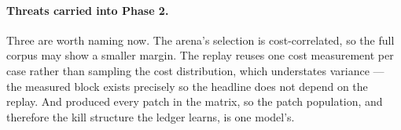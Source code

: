 \paragraph{Threats carried into Phase 2.} Three are worth naming now. The
arena's selection is cost-correlated, so the full corpus may show a smaller
margin. The replay reuses one cost measurement per case rather than sampling
the cost distribution, which understates variance --- the measured block exists
precisely so the headline does not depend on the replay. And 
produced every patch in the matrix, so the patch population, and therefore the
kill structure the ledger learns, is one model's.
